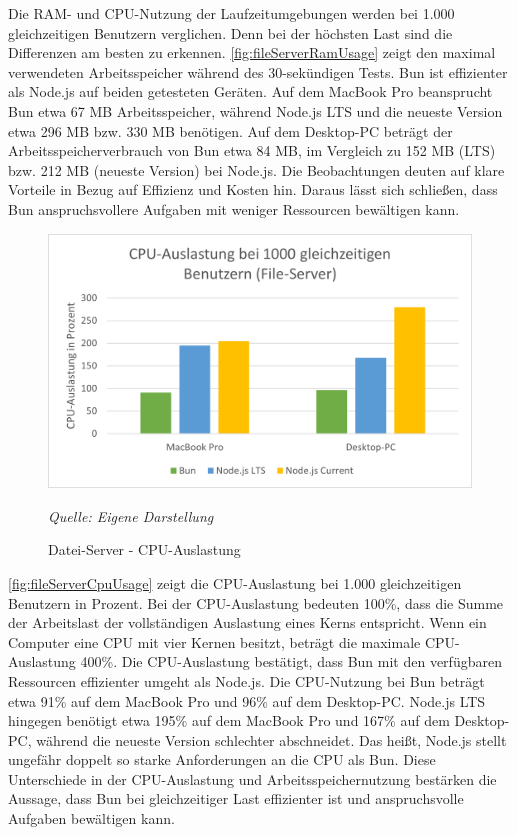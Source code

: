 \noindent
Die RAM- und CPU-Nutzung der Laufzeitumgebungen werden bei 1.000 gleichzeitigen Benutzern verglichen. Denn bei der höchsten Last sind die Differenzen am besten zu erkennen. \autoref{fig:fileServerRamUsage} zeigt den maximal verwendeten Arbeitsspeicher während des 30-sekündigen Tests. Bun ist effizienter als Node.js auf beiden getesteten Geräten. Auf dem MacBook Pro beansprucht Bun etwa 67 MB Arbeitsspeicher, während Node.js LTS und die neueste Version etwa 296 MB bzw. 330 MB benötigen. Auf dem Desktop-PC beträgt der Arbeitsspeicherverbrauch von Bun etwa 84 MB, im Vergleich zu 152 MB (LTS) bzw. 212 MB (neueste Version) bei Node.js. Die Beobachtungen deuten auf klare Vorteile in Bezug auf Effizienz und Kosten hin. Daraus lässt sich schließen, dass Bun anspruchsvollere Aufgaben mit weniger Ressourcen bewältigen kann.\\

\begin{figure}[h!]
	\centering
	\includegraphics[width=\linewidth]{./images/fileServerCpuUsage.png}
	\caption{Datei-Server - CPU-Auslastung }
	\label{fig:fileServerCpuUsage}
	\textit{Quelle: Eigene Darstellung}
\end{figure}

\noindent
\autoref{fig:fileServerCpuUsage} zeigt die CPU-Auslastung bei 1.000 gleichzeitigen Benutzern in Prozent. Bei der CPU-Auslastung bedeuten 100\%, dass die Summe der Arbeitslast der vollständigen Auslastung eines Kerns entspricht. Wenn ein Computer eine CPU mit vier Kernen besitzt, beträgt die maximale CPU-Auslastung 400\%. Die CPU-Auslastung bestätigt, dass Bun mit den verfügbaren Ressourcen effizienter umgeht als Node.js. Die CPU-Nutzung bei Bun beträgt etwa 91\% auf dem MacBook Pro und 96\% auf dem Desktop-PC. Node.js LTS hingegen benötigt etwa 195\% auf dem MacBook Pro und 167\% auf dem Desktop-PC, während die neueste Version schlechter abschneidet. Das heißt, Node.js stellt ungefähr doppelt so starke Anforderungen an die CPU als Bun. Diese Unterschiede in der CPU-Auslastung und Arbeitsspeichernutzung bestärken die Aussage, dass Bun bei gleichzeitiger Last effizienter ist und anspruchsvolle Aufgaben bewältigen kann.\\

